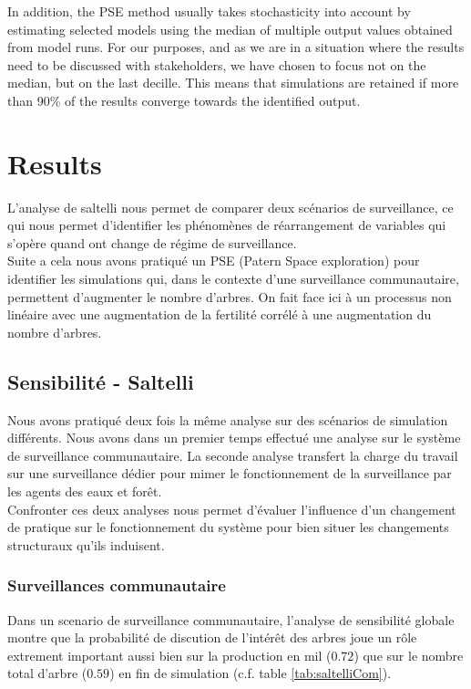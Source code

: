 \documentclass{article}
\begin{document}
    In addition, the PSE method usually takes stochasticity into account by estimating selected models using the median of multiple output values obtained from model runs. For our purposes, and as we are in a situation where the results need to be discussed with stakeholders, we have chosen to focus not on the median, but on the last decille. This means that simulations are retained if more than 90\% of the results converge towards the identified output.

\section{Results}

L'analyse de saltelli nous permet de comparer deux scénarios de surveillance, ce qui nous permet d'identifier les phénomènes de réarrangement de variables qui s'opère quand ont change de régime de surveillance.\\
    
Suite a cela nous avons pratiqué un PSE (Patern Space exploration) pour identifier les simulations qui, dans le contexte d'une surveillance communautaire, permettent d'augmenter le nombre d'arbres. On fait face ici à un processus non linéaire avec une augmentation de la fertilité corrélé à une augmentation du nombre d'arbres.

    \subsection{Sensibilité - Saltelli}

    Nous avons pratiqué deux fois la même analyse sur des scénarios de simulation différents. Nous avons dans un premier temps effectué une analyse sur le système de surveillance communautaire. La seconde analyse transfert la charge du travail sur une surveillance dédier pour mimer le fonctionnement de la surveillance par les agents des eaux et forêt.\\
    
    Confronter ces deux analyses nous permet d'évaluer l'influence d'un changement de pratique sur le fonctionnement du système pour bien situer les changements structuraux qu'ils induisent.

    \subsubsection{Surveillances communautaire}

        Dans un scenario de surveillance communautaire, l'analyse de sensibilité globale montre que la probabilité de discution de l'intérêt des arbres joue un rôle extrement important aussi bien sur la production en mil ($0.72$) que sur le nombre total d'arbre ($0.59$) en fin de simulation (c.f. table \ref{tab:saltelliCom}).\\
\end{document}
